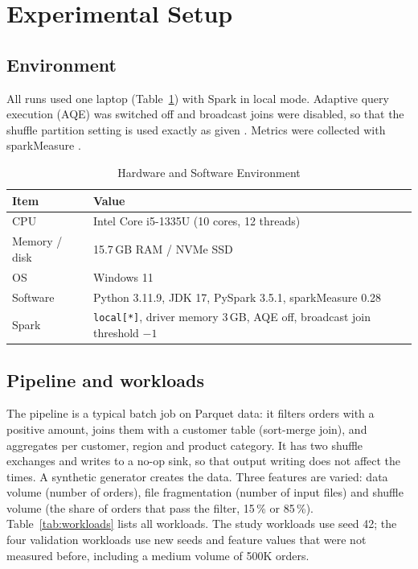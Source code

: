 \section{Experimental Setup}
\label{sec:method}

\subsection{Environment}
All runs used one laptop (Table~\ref{tab:env}) with Spark in local mode. Adaptive query
execution (AQE) was switched off and broadcast joins were disabled, so that the shuffle
partition setting is used exactly as given \cite{spark2024tuning}. Metrics were collected with
sparkMeasure \cite{canali2024sparkmeasure}.

\begin{table}[t]
\caption{Hardware and Software Environment}
\label{tab:env}
\centering
\small
\begin{tabular}{@{}lp{}@{}}
\toprule
Item & Value \\
\midrule
CPU & Intel Core i5-1335U (10 cores, 12 threads) \\
Memory / disk & 15.7\,GB RAM / NVMe SSD \\
OS & Windows 11 \\
Software & Python 3.11.9, JDK 17, PySpark 3.5.1, sparkMeasure 0.28 \\
Spark & \texttt{local[*]}, driver memory 3\,GB, AQE off, broadcast join threshold $-1$ \\
\bottomrule
\end{tabular}
\end{table}

\subsection{Pipeline and workloads}
The pipeline is a typical batch job on Parquet data: it filters orders with a positive amount,
joins them with a customer table (sort-merge join), and aggregates per customer, region and
product category.
It has two shuffle exchanges and writes to a no-op sink, so that output writing does not
affect the times. A synthetic generator creates the data. Three features are varied: data
volume (number of orders), file fragmentation (number of input files) and shuffle volume (the
share of orders that pass the filter, 15\,\% or 85\,\%). Table~\ref{tab:workloads} lists all
workloads. The study workloads use seed 42; the four validation workloads use new seeds and
feature values that were not measured before, including a medium volume of 500K orders.

